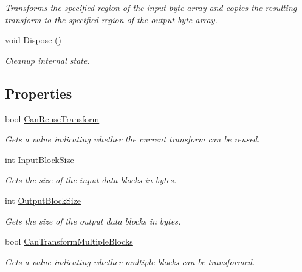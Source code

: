 \begin{DoxyCompactItemize}
\begin{DoxyCompactList}\small\item\em Transforms the specified region of the input byte array and copies the resulting transform to the specified region of the output byte array. \end{DoxyCompactList}\item 
void \hyperlink{class_i_c_sharp_code_1_1_sharp_zip_lib_1_1_encryption_1_1_pkzip_classic_decrypt_crypto_transform_a231f40f7c34ac196ca75b97363b8e63e}{Dispose} ()
\begin{DoxyCompactList}\small\item\em Cleanup internal state. \end{DoxyCompactList}\end{DoxyCompactItemize}
\subsection*{Properties}
\begin{DoxyCompactItemize}
\item 
bool \hyperlink{class_i_c_sharp_code_1_1_sharp_zip_lib_1_1_encryption_1_1_pkzip_classic_decrypt_crypto_transform_a02d0ce13d5f0b303dbb776188bccbe07}{Can\+Reuse\+Transform}
\begin{DoxyCompactList}\small\item\em Gets a value indicating whether the current transform can be reused. \end{DoxyCompactList}\item 
int \hyperlink{class_i_c_sharp_code_1_1_sharp_zip_lib_1_1_encryption_1_1_pkzip_classic_decrypt_crypto_transform_a44b7c88f7c64ae5676c987fa94094dcc}{Input\+Block\+Size}
\begin{DoxyCompactList}\small\item\em Gets the size of the input data blocks in bytes. \end{DoxyCompactList}\item 
int \hyperlink{class_i_c_sharp_code_1_1_sharp_zip_lib_1_1_encryption_1_1_pkzip_classic_decrypt_crypto_transform_a89d611b16bf6ad30d58ded5e70dc761e}{Output\+Block\+Size}
\begin{DoxyCompactList}\small\item\em Gets the size of the output data blocks in bytes. \end{DoxyCompactList}\item 
bool \hyperlink{class_i_c_sharp_code_1_1_sharp_zip_lib_1_1_encryption_1_1_pkzip_classic_decrypt_crypto_transform_a7b34c9ae417170cc40eca0ef60c10e5b}{Can\+Transform\+Multiple\+Blocks}
\begin{DoxyCompactList}\small\item\em Gets a value indicating whether multiple blocks can be transformed. \end{DoxyCompactList}\end{DoxyCompactItemize}

